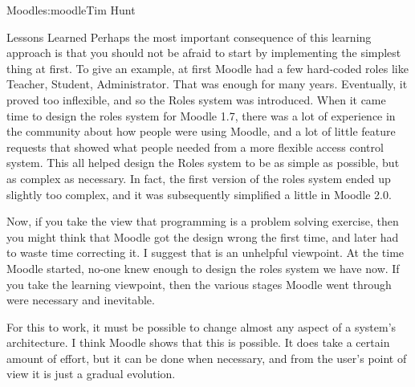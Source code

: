 \begin{aosachapter}{Moodle}{s:moodle}{Tim Hunt}
\begin{aosasect1}{Lessons Learned}
Perhaps the most important consequence of this learning approach is
that you should not be afraid to start by implementing the simplest
thing at first. To give an example, at first Moodle had a few
hard-coded roles like Teacher, Student, Administrator. That was enough
for many years. Eventually, it proved too inflexible, and so the Roles
system was introduced. When it came time to design the roles system
for Moodle 1.7, there was a lot of experience in the community about
how people were using Moodle, and a lot of little feature requests
that showed what people needed from a more flexible access control
system. This all helped design the Roles system to be as simple as
possible, but as complex as necessary. In fact, the first version of
the roles system ended up slightly too complex, and it was
subsequently simplified a little in Moodle 2.0.

Now, if you take the view that programming is a problem solving
exercise, then you might think that Moodle got the design wrong the
first time, and later had to waste time correcting it. I suggest that
is an unhelpful viewpoint. At the time Moodle started, no-one knew
enough to design the roles system we have now. If you take the
learning viewpoint, then the various stages Moodle went through were
necessary and inevitable.

For this to work, it must be possible to change almost any aspect of a
system's architecture. I think Moodle shows that this is possible. It
does take a certain amount of effort, but it can be done when
necessary, and from the user's point of view it is just a gradual
evolution.

\end{aosasect1}

\end{aosachapter}
